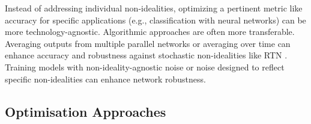 


\noindent Instead of addressing individual non-idealities, optimizing a pertinent metric like accuracy for specific applications (e.g., classification with neural networks) can be more technology-agnostic. Algorithmic approaches are often more transferable. Averaging outputs from multiple parallel networks or averaging over time can enhance accuracy and robustness against stochastic non-idealities like RTN \cite{wan2020voltage}. Training models with non-ideality-agnostic noise \cite{ye2023improving} or noise designed to reflect specific non-idealities \cite{huang2021method} can enhance network robustness.

\subsection[Optimisation Approaches]{Optimisation Approaches}

